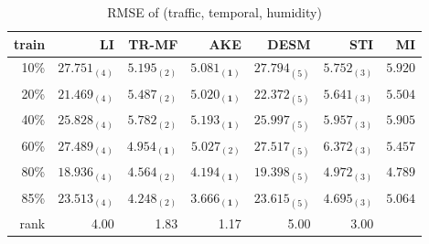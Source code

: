 %
%
%


\begin{table} [htbp]
\setlength{\tabcolsep}{2pt}
\centering
\caption{RMSE of (traffic, temporal, humidity)}
\label{table:traffic_temporal_hum}
\begin{tabular}{ r | r r r r r r}
	train	&LI	&TR-MF	&AKE	&DESM	&STI &MI\\ \hline
	10\% & $ 27.751_{(4)} $ & $ 5.195_{(2)} $ & $ \mathbf{ 5.081_{(1)} } $ & $ 27.794_{(5)} $ & $ 5.752_{(3)} $ &$5.920$\\
	20\% & $ 21.469_{(4)} $ & $ 5.487_{(2)} $ & $ \mathbf{ 5.020_{(1)} } $ & $ 22.372_{(5)} $ & $ 5.641_{(3)} $ &$5.504$\\
	40\% & $ 25.828_{(4)} $ & $ 5.782_{(2)} $ & $ \mathbf{ 5.193_{(1)} } $ & $ 25.997_{(5)} $ & $ 5.957_{(3)} $ &$5.905$\\
	60\% & $ 27.489_{(4)} $ & $ \mathbf{ 4.954_{(1)} } $ & $ 5.027_{(2)} $ & $ 27.517_{(5)} $ & $ 6.372_{(3)} $ &$5.457$\\
	80\% & $ 18.936_{(4)} $ & $ 4.564_{(2)} $ & $ \mathbf{ 4.194_{(1)} } $ & $ 19.398_{(5)} $ & $ 4.972_{(3)} $ &$4.789$\\
	85\% & $ 23.513_{(4)} $ & $ 4.248_{(2)} $ & $ \mathbf{ 3.666_{(1)} } $ & $ 23.615_{(5)} $ & $ 4.695_{(3)} $ &$5.064$\\ \hline
	rank &4.00 &1.83 &1.17 &5.00 &3.00 \\
\end{tabular}
\end{table}


